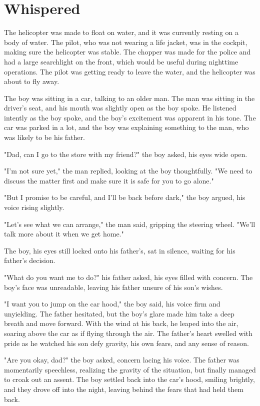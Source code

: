\documentclass[smalldemyvopaper,11pt,twoside,onecolumn,openright,extrafontsizes]{memoir}
\begin{document}
\chapter{Whispered}
The helicopter was made to float on water, and it was currently resting on a body of water. The pilot, who was not wearing a life jacket, was in the cockpit, making sure the helicopter was stable. The chopper was made for the police and had a large searchlight on the front, which would be useful during nighttime operations. The pilot was getting ready to leave the water, and the helicopter was about to fly away.\par
The boy was sitting in a car, talking to an older man. The man was sitting in the driver's seat, and his mouth was slightly open as the boy spoke. He listened intently as the boy spoke, and the boy's excitement was apparent in his tone. The car was parked in a lot, and the boy was explaining something to the man, who was likely to be his father.\par
"Dad, can I go to the store with my friend?" the boy asked, his eyes wide open.\par
"I'm not sure yet," the man replied, looking at the boy thoughtfully. "We need to discuss the matter first and make sure it is safe for you to go alone."\par
"But I promise to be careful, and I'll be back before dark," the boy argued, his voice rising slightly.\par
"Let's see what we can arrange," the man said, gripping the steering wheel. "We'll talk more about it when we get home."\par
The boy, his eyes still locked onto his father's, sat in silence, waiting for his father's decision.\par
"What do you want me to do?" his father asked, his eyes filled with concern. The boy's face was unreadable, leaving his father unsure of his son's wishes.\par
"I want you to jump on the car hood," the boy said, his voice firm and unyielding. The father hesitated, but the boy's glare made him take a deep breath and move forward. With the wind at his back, he leaped into the air, soaring above the car as if flying through the air. The father's heart swelled with pride as he watched his son defy gravity, his own fears, and any sense of reason.\par
"Are you okay, dad?" the boy asked, concern lacing his voice. The father was momentarily speechless, realizing the gravity of the situation, but finally managed to croak out an assent. The boy settled back into the car's hood, smiling brightly, and they drove off into the night, leaving behind the fears that had held them back.\par
\end{document}
